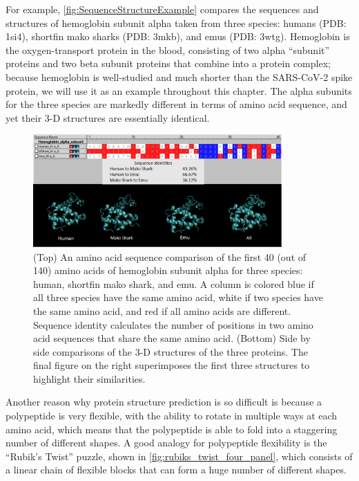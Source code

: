 For example, \autoref{fig:SequenceStructureExample} compares the sequences and structures of hemoglobin subunit alpha taken from three species: humans (PDB: 1si4), shortfin mako sharks (PDB: 3mkb), and emus (PDB: 3wtg). Hemoglobin is the oxygen-transport protein in the blood, consisting of two alpha ``subunit'' proteins and two beta subunit proteins that combine into a protein complex; because hemoglobin is well-studied and much shorter than the SARS-CoV-2 spike protein, we will use it as an example throughout this chapter. The alpha subunits for the three species are markedly different in terms of amino acid sequence, and yet their 3-D structures are essentially identical.\\

\begin{figure}[h]
	\centering
	\mySfFamily
	\includegraphics[width = 0.85\textwidth]{../images/SequenceStructureExample.png}
	\caption{(Top) An amino acid sequence comparison of the first 40 (out of 140) amino acids of hemoglobin subunit alpha for three species: human, shortfin mako shark, and emu. A column is colored blue if all three species have the same amino acid, white if two species have the same amino acid, and red if all amino acids are different. Sequence identity calculates the number of positions in two amino acid sequences that share the same amino acid. (Bottom) Side by side comparisons of the 3-D structures of the three proteins. The final figure on the right superimposes the first three structures to highlight their similarities.}
	\label{fig:SequenceStructureExample}
\end{figure}

Another reason why protein structure prediction is so difficult is because a polypeptide is very flexible, with the ability to rotate in multiple ways at each amino acid, which means that the polypeptide is able to fold into a staggering number of different shapes. A good analogy for polypeptide flexibility is the ``Rubik's Twist'' puzzle, shown in \autoref{fig:rubiks_twist_four_panel}, which consists of a linear chain of flexible blocks that can form a huge number of different shapes.

